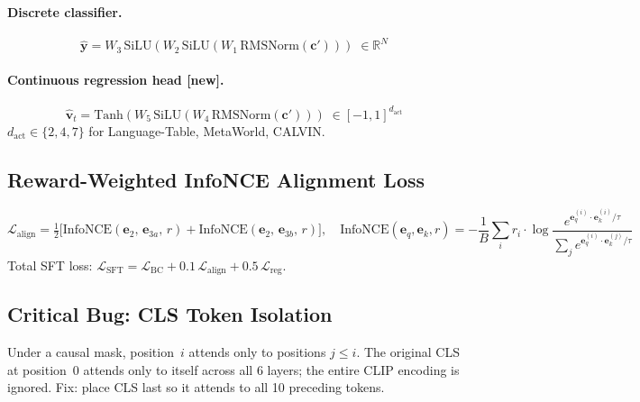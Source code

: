 \documentclass{article}
\newcommand{\NEW}{\textcolor{NewOrange}{\textbf{[new]}}\xspace}
\begin{document}
\paragraph{Discrete classifier.}
\begin{equation}
  \hat{\mathbf{y}} = W_3\,\mathrm{SiLU}(W_2\,\mathrm{SiLU}(W_1\,\mathrm{RMSNorm}(\mathbf{c}')))
  \;\in\mathbb{R}^N
\end{equation}

\paragraph{Continuous regression head \NEW.}
\begin{equation}
  \hat{\mathbf{v}}_t = \mathrm{Tanh}(W_5\,\mathrm{SiLU}(W_4\,\mathrm{RMSNorm}(\mathbf{c}')))
  \;\in[-1,1]^{d_{\mathrm{act}}}
\end{equation}
$d_{\mathrm{act}}\!\in\!\{2,4,7\}$ for Language-Table, MetaWorld, CALVIN.

\subsection{Reward-Weighted InfoNCE Alignment Loss}
\label{sec:alignment}
\begin{equation}
  \mathcal{L}_{\mathrm{align}}
  = \tfrac{1}{2}\bigl[
    \mathrm{InfoNCE}(\mathbf{e}_2,\,\mathbf{e}_{3a},\,r)
    + \mathrm{InfoNCE}(\mathbf{e}_2,\,\mathbf{e}_{3b},\,r)
  \bigr],
  \quad
  \mathrm{InfoNCE}(\mathbf{e}_q,\mathbf{e}_k,r)
  = -\frac{1}{B}\sum_{i}r_i\cdot
    \log\frac{e^{\mathbf{e}_q^{(i)}\cdot\mathbf{e}_k^{(i)}/\tau}}
             {\sum_{j}e^{\mathbf{e}_q^{(i)}\cdot\mathbf{e}_k^{(j)}/\tau}}
\end{equation}
Total SFT loss: $\mathcal{L}_{\mathrm{SFT}}
  = \mathcal{L}_{\mathrm{BC}} + 0.1\,\mathcal{L}_{\mathrm{align}}
  + 0.5\,\mathcal{L}_{\mathrm{reg}}$.

\subsection{Critical Bug: CLS Token Isolation}
\label{sec:bug}
Under a causal mask, position~$i$ attends only to positions $j{\le}i$.
The original CLS at position~0 attends only to itself across all 6 layers;
the entire CLIP encoding is ignored.
Fix: place CLS last so it attends to all 10 preceding tokens.
\end{document}
